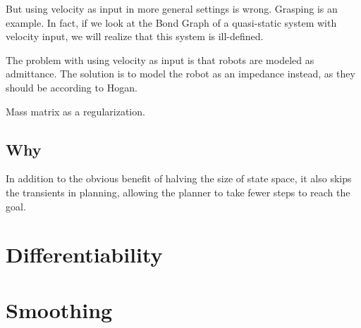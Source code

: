 But using velocity as input in more general settings is wrong. Grasping is an example. In fact, if we look at the Bond Graph of a quasi-static system with velocity input, we will realize that this system is ill-defined. 

The problem with using velocity as input is that robots are modeled as admittance. The solution is to model the robot as an impedance instead, as they should be according to Hogan.

Mass matrix as a regularization.

\subsection{Why}
In addition to the obvious benefit of halving the size of state space, it also skips the transients in planning, allowing the planner to take fewer steps to reach the goal.


\section{Differentiability}

\section{Smoothing}